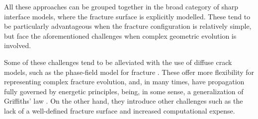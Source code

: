     All these approaches can be grouped together in the broad category of sharp interface models, where the fracture surface is explicitly modelled. These tend to be particularly advantageous when the fracture configuration is relatively simple, but face the aforementioned challenges when complex geometric evolution is involved. 
    
    Some of these challenges tend to be alleviated with the use of diffuse crack models, such as the phase-field model for fracture \cite{francfort1998revisiting, bourdin2000numerical, karma2001phase}. These offer more flexibility for representing complex fracture evolution, and, in many times, have propagation fully governed by energetic principles, being, in some sense, a generalization of Griffiths' law \cite{griffith1921vi}. On the other hand, they introduce other challenges such as the lack of a well-defined fracture surface and increased computational expense\cite{heider2021review}.  






